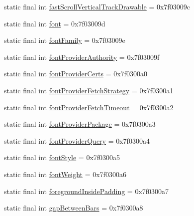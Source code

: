 \begin{DoxyCompactItemize}
\item 
static final int \mbox{\hyperlink{classandroid_1_1support_1_1design_1_1R_1_1attr_a3c3952d5649ec718fd0d14de949a69eb}{fast\+Scroll\+Vertical\+Track\+Drawable}} = 0x7f03009c
\item 
static final int \mbox{\hyperlink{classandroid_1_1support_1_1design_1_1R_1_1attr_ac64c32894b875c84fac5535fb0604ec6}{font}} = 0x7f03009d
\item 
static final int \mbox{\hyperlink{classandroid_1_1support_1_1design_1_1R_1_1attr_af9123967cb1c1a08b75a8e47c73edfaf}{font\+Family}} = 0x7f03009e
\item 
static final int \mbox{\hyperlink{classandroid_1_1support_1_1design_1_1R_1_1attr_a4a1de2d527e82ce9ba618bac92e678a8}{font\+Provider\+Authority}} = 0x7f03009f
\item 
static final int \mbox{\hyperlink{classandroid_1_1support_1_1design_1_1R_1_1attr_a03e4b5678e0526d8f9af6bd5f9b5d26f}{font\+Provider\+Certs}} = 0x7f0300a0
\item 
static final int \mbox{\hyperlink{classandroid_1_1support_1_1design_1_1R_1_1attr_a005550e60860b30a81e4b89cc3ecdcd0}{font\+Provider\+Fetch\+Strategy}} = 0x7f0300a1
\item 
static final int \mbox{\hyperlink{classandroid_1_1support_1_1design_1_1R_1_1attr_af2920644bc3669b07801976532c7fb32}{font\+Provider\+Fetch\+Timeout}} = 0x7f0300a2
\item 
static final int \mbox{\hyperlink{classandroid_1_1support_1_1design_1_1R_1_1attr_a64612dba5bb16762a9026d7a74d28739}{font\+Provider\+Package}} = 0x7f0300a3
\item 
static final int \mbox{\hyperlink{classandroid_1_1support_1_1design_1_1R_1_1attr_add146e92dad3ce33dc850761e58ecb40}{font\+Provider\+Query}} = 0x7f0300a4
\item 
static final int \mbox{\hyperlink{classandroid_1_1support_1_1design_1_1R_1_1attr_adff98e7087697457277b767e626def5a}{font\+Style}} = 0x7f0300a5
\item 
static final int \mbox{\hyperlink{classandroid_1_1support_1_1design_1_1R_1_1attr_a6a55f3eadb00895d0383f5379ef0d285}{font\+Weight}} = 0x7f0300a6
\item 
static final int \mbox{\hyperlink{classandroid_1_1support_1_1design_1_1R_1_1attr_a133378181d31801943cf01d474253db0}{foreground\+Inside\+Padding}} = 0x7f0300a7
\item 
static final int \mbox{\hyperlink{classandroid_1_1support_1_1design_1_1R_1_1attr_af5aa83bca46ec78627ca7af277ace09a}{gap\+Between\+Bars}} = 0x7f0300a8

\end{DoxyCompactItemize}
